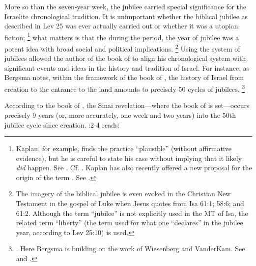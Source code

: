More so than the seven-year week, the jubilee carried special significance for the Israelite chronological tradition. It is unimportant whether the biblical jubilee as described in Lev 25 was ever actually carried out or whether it was a utopian fiction;%
    \footnote{%
        Kaplan, for example, finds the practice ``plausible'' (without affirmative evidence), but he is careful to state his case without implying that it likely \emph{did} happen. See 
        \cite{kaplan_cbq2019}. Cf. 
        \cite[119]{wellhausen1957}. Kaplan has also recently offered a new proposal for the origin of the term . See 
        \cite{kaplan_biblica2018}.}
what matters is that the during the \secondtemple period, the year of jubilee was a potent idea with broad social and political implications.%
    \footnote{%
        The imagery of the biblical jubilee is even evoked in the Christian New Testament in the gospel of Luke when Jesus quotes from Isa 61:1; 58:6; and 61:2. Although the term  ``jubilee'' is not explicitly used in the MT of Isa, the related term  ``liberty'' (the term used for what one ``declares'' in the jubilee year, according to Lev 25:10) is used.}
Using the system of jubilees allowed the author of the book of \jub to align his chronological system with significant events and ideas in the history and tradition of Israel. For instance, as Bergsma notes, within the framework of the book of \jub, the history of Israel from creation to the entrance to the land amounts to precisely 50 cycles of jubilees.%
    \footnote{%
        \Cite[234--235]{bergsma2007}. Here Bergsma is building on the work of Wiesenberg and VanderKam. See
        \cite[4]{wiesenberg_rev-qumran1961} and 
        \cite[522]{vanderkam-b_vanderkam2000}.}

According to the book of \jub, the Sinai revelation---where the book of \jub is set---occurs precisely 9 years (or, more accurately, one week and two years) into the 50th jubilee cycle since creation. :2-4 reads:



